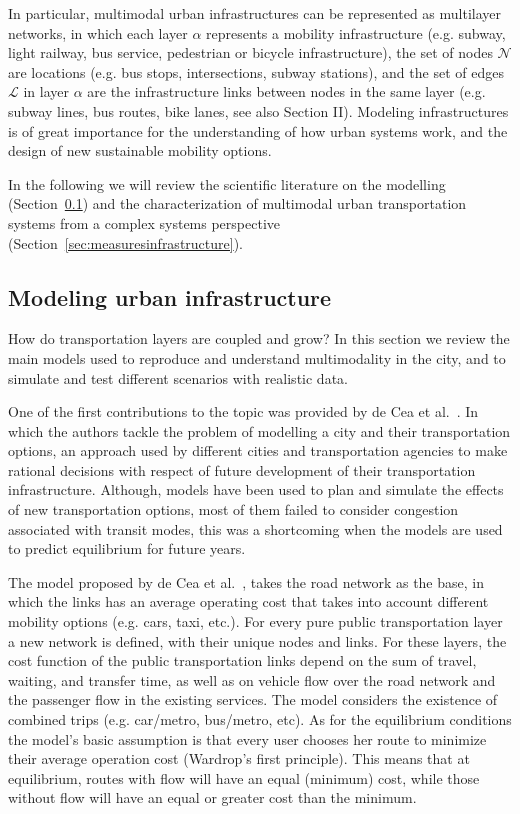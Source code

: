 In particular, multimodal urban infrastructures can be represented as multilayer networks, in which each layer $\alpha$ represents a mobility infrastructure (e.g. subway, light railway, bus service, pedestrian or bicycle infrastructure), the set of nodes $\mathcal{N}$ are locations (e.g. bus stops, intersections, subway stations), and the set of edges $\mathcal{L}$ in layer $\alpha$ are the infrastructure links between nodes in the same layer (e.g. subway lines, bus routes, bike lanes, see also Section II).
Modeling infrastructures is of great importance for the understanding of how urban systems work, and the design of new sustainable mobility options. 

In the following we will review the scientific literature on the modelling (Section~\ref{sec:modelinginsrastructure}) and the characterization of multimodal urban transportation systems from a complex systems perspective (Section~\ref{sec:measuresinfrastructure}).

\subsection{Modeling urban infrastructure}\label{sec:modelinginsrastructure}

How do transportation layers are coupled and grow?
In this section we review the main models used to reproduce and understand multimodality in the city, and to simulate and test different scenarios with realistic data. 

One of the first contributions to the topic was provided by de Cea et al.~\cite{decea2005equilibrium}. In which the authors tackle the problem of modelling a city and their transportation options, an approach used by different cities and transportation agencies to make rational decisions with respect of future development of their transportation infrastructure. Although, models have been used to plan and simulate the effects of new transportation options, most of them failed to consider congestion associated with transit modes, this was a shortcoming when the models are used to predict equilibrium for future years. 

The model proposed by de Cea et al.~\cite{decea2005equilibrium}, takes the road network as the base, in which the links has an average operating cost that takes into account different mobility options (e.g. cars, taxi, etc.). For every pure public transportation layer a new network is defined, with their unique nodes and links. For these layers, the cost function of the public transportation links depend on the sum of travel, waiting, and transfer time, as well as on vehicle flow over the road network and the passenger flow in the existing services. The model considers the existence of combined trips (e.g. car/metro, bus/metro, etc). As for the equilibrium conditions the model's basic assumption is that every user chooses her route to minimize their average operation cost (Wardrop’s first principle). This means that at equilibrium, routes with flow will have an equal (minimum) cost, while those without flow will have an equal or greater cost than the minimum.

